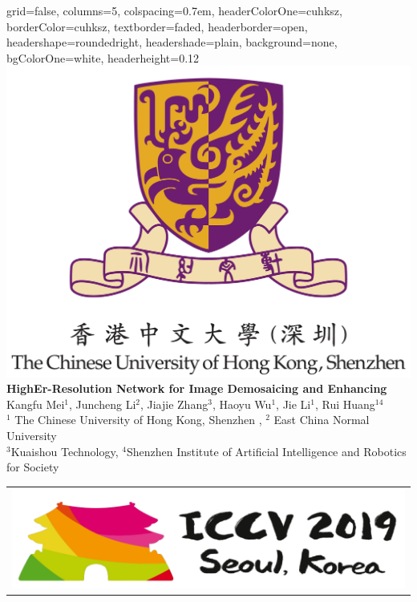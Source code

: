\documentclass[landscape,a0paper,fontscale=0.292]{baposter}
\begin{document}
\begin{poster}{
 grid=false,
 columns=5,
 colspacing=0.7em,
 headerColorOne=cuhksz,
 borderColor=cuhksz,
 textborder=faded,
 headerborder=open,
 headershape=roundedright,
 headershade=plain,
 background=none,
 bgColorOne=white,
 headerheight=0.12\textheight}
 {
      \includegraphics[width=0.1\linewidth]{CUSZ}
 }
 {\sc\huge\bf HighEr-Resolution Network for Image Demosaicing and Enhancing}
 {\vspace{0.3em} Kangfu Mei$^1$, Juncheng Li$^2$, Jiajie Zhang$^3$, Haoyu Wu$^1$, Jie Li$^1$, Rui Huang$^{14}$ \\[0.2em]
 {\normalsize $^1$ The Chinese University of Hong Kong, Shenzhen , $^2$ East China Normal University\\ $^3$Kuaishou Technology, $^4$Shenzhen Institute of Artificial Intelligence and Robotics for Society \\[0.2em] }}
 {
    \begin{tabular}{r}
        \includegraphics[width=0.15\linewidth]{iccv19}
    \end{tabular}
 }



\end{poster}
\end{document}
